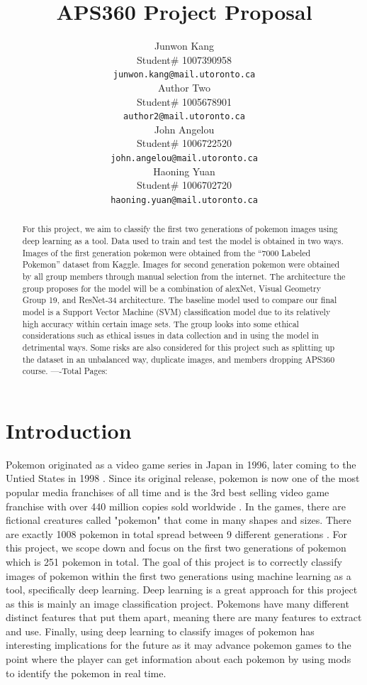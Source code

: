 \documentclass{article} %
\title{APS360 Project Proposal}
\author{Junwon Kang  \\
Student\# 1007390958\\
\texttt{junwon.kang@mail.utoronto.ca} \\
\And
Author Two  \\
Student\# 1005678901 \\
\texttt{author2@mail.utoronto.ca} \\
\AND
John Angelou  \\
Student\# 1006722520 \\
\texttt{john.angelou@mail.utoronto.ca} \\
\And
Haoning Yuan \\
Student\# 1006702720 \\
\texttt{haoning.yuan@mail.utoronto.ca} \\
\AND
}
\begin{document}
\maketitle

\begin{abstract}
For this project, we aim to classify the first two generations of pokemon images using deep learning as a tool. Data used to train and test the model is obtained in two ways. Images of the first generation pokemon were obtained from the “7000 Labeled Pokemon” dataset from Kaggle.  Images for second generation pokemon were obtained by all group members through manual selection from the internet. The architecture the group proposes for the model will be a combination of alexNet, Visual Geometry Group 19, and ResNet-34 architecture. The baseline model used to compare our final model is a Support Vector Machine (SVM) classification model due to its relatively high accuracy within certain image sets. The group looks into some ethical considerations such as ethical issues in data collection and in using the model in detrimental ways. Some risks are also considered for this project such as splitting up the dataset in an unbalanced way, duplicate images, and members dropping APS360 course. 
----Total Pages: \pageref{last_page}
\end{abstract}



\section{Introduction}

Pokemon originated as a video game series in Japan in 1996, later coming to the Untied States in 1998 \citep{Britannica}. Since its original release, pokemon is now one of the most popular media franchises of all time and is the 3rd best selling video game franchise with over 440 million copies sold worldwide \citep{PokemonCompany}. In the games, there are fictional creatures called "pokemon" that come in many shapes and sizes. There are exactly 1008 pokemon in total spread between 9 different generations \citep{PokemonNum}. For this project, we scope down and focus on the first two generations of pokemon which is 251 pokemon in total. The goal of this project is to correctly classify images of pokemon within the first two generations using machine learning as a tool, specifically deep learning. Deep learning is a great approach for this project as this is mainly an image classification project. Pokemons have many different distinct features that put them apart, meaning there are many features to extract and use. Finally, using deep learning to classify images of pokemon has interesting implications for the future as it may advance pokemon games to the point where the player can get information about each pokemon by using mods to identify the pokemon in real time.
\end{document}
